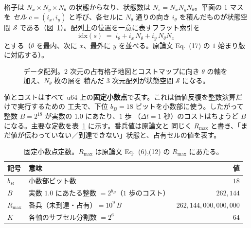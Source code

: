 \documentclass[11pt]{ltjsarticle}
\newcommand{\idx}{\mathrm{idx}}
\newcommand{\Rmax}{R_{\max}}        %
\begin{document}
格子は $N_x\times N_y\times N_\theta$ の状態からなり、状態数は $N_s=N_x N_y N_\theta$。平面の $1$ マスを
\emph{セル} $c=(i_x,i_y)$ と呼び、各セルに $N_\theta$ 通りの向き $i_\theta$ を積んだものが状態空間
$\mathcal{S}$ である（図~\ref{fig:arrays}）。配列上の位置を一意に表すフラット索引を
\begin{equation}
\idx(s) \;=\; i_\theta + i_x\,N_\theta + i_y\,N_\theta N_x
\label{eq:idx}
\end{equation}
とする（$\theta$ を最内、次に $x$、最外に $y$ を並べる。原論文 Eq.~(17) の $1$ 始まり版に対応する）。

\begin{figure}[h]
\centering
{}
\caption{データ配列。$2$ 次元の占有格子地図とコストマップに向き $\theta$ の軸を加え、$N_\theta$ 枚の層を
積んだ $3$ 次元配列が状態空間 $\mathcal{S}$ になる。}
\label{fig:arrays}
\end{figure}

値とコストはすべて u64 上の\textbf{固定小数点}で表す。これは価値反復を整数演算だけで実行するための
工夫で、下位 $b_B=18$ ビットを小数部に使う。したがって整数 $B=2^{18}$ が実数の $1.0$ にあたり、$1$ 歩
（$\Delta t=1$ 秒）のコストはちょうど $B$ になる。主要な定数を表~\ref{tab:const} に示す。番兵値は原論文と
同じく $\Rmax$ と書き、「まだ値が伝わっていない／到達できない」状態と、占有セルの値を表す。

\begin{table}[h]
\centering
\begin{tabular}{llr}
\toprule
記号 & 意味 & 値 \\
\midrule
$b_B$    & 小数部ビット数 & $18$ \\
$B$      & 実数 $1.0$ にあたる整数 $=2^{b_B}$（$1$ 歩のコスト） & $262{,}144$ \\
$\Rmax$  & 番兵（未到達・占有）$=10^{9}\,B$ & $262{,}144{,}000{,}000{,}000$ \\
$K$      & 各軸のサブセル分割数 $=2^{6}$ & $64$ \\
\bottomrule
\end{tabular}
\caption{固定小数点定数。$\Rmax$ は原論文 Eq.~(6),(12) の $R_{\max}$ にあたる。}
\label{tab:const}
\end{table}
\end{document}
